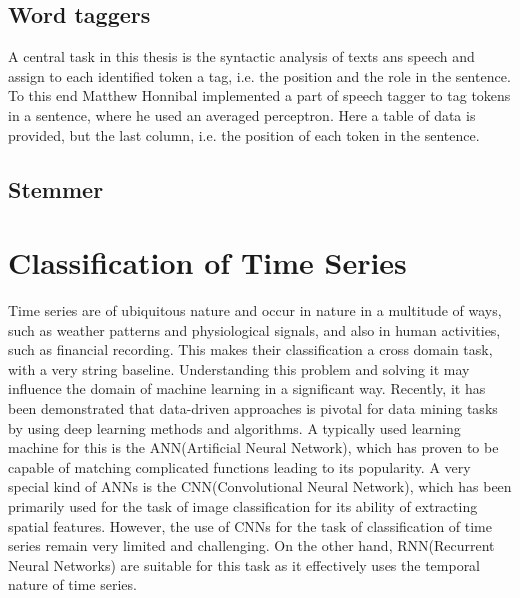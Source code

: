 \subsection{Word taggers}\label{subsec:wordtaggers}
A central task in this thesis is the syntactic analysis of texts ans speech and assign to each identified token a tag, i.e. the position and the role in the sentence\cite{nadkarni2011natural}. To this end Matthew Honnibal implemented a part of speech tagger to tag tokens in a sentence, where he used an averaged perceptron. Here a table of data is provided, but the last column, i.e. the position of each token in the sentence. \cite{honnibal_2013} 
\subsection{Stemmer}\label{subsec:stemmer}
\section{Classification of Time Series}
Time series are of ubiquitous nature and occur in nature in a multitude of ways, such as weather patterns and physiological signals, and also in human activities, such as financial recording. This makes their classification a cross domain task, with a very string baseline. Understanding this problem and solving it may influence the domain of machine learning in a significant way\cite{wang2017time}. Recently, it has been demonstrated that data-driven approaches is pivotal for data mining tasks by using deep learning methods and algorithms. A typically used learning machine for this is the ANN(Artificial Neural Network), which has proven to be capable of matching complicated functions leading to its popularity. A very special kind of ANNs is the CNN(Convolutional Neural Network), which has been primarily used for the task of image classification for its ability of extracting spatial features. However, the use of CNNs for the task of classification of time series remain very limited and challenging. On the other hand, RNN(Recurrent Neural Networks) are suitable for this task as it effectively uses the temporal nature of time series.\cite{yang2019time}

